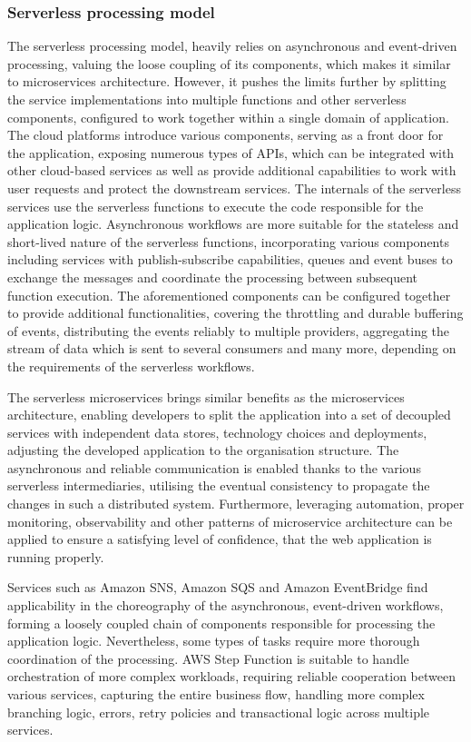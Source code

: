\subsubsection{Serverless processing model}

The serverless processing model, heavily relies on asynchronous and event-driven processing, valuing the loose coupling of its components, which makes it similar to microservices architecture.
However, it pushes the limits further by splitting the service implementations into multiple functions and other serverless components, configured to work together within a single domain of application.
The cloud platforms introduce various components, serving as a front door for the application, exposing numerous types of APIs, which can be integrated with other cloud-based services as well as provide additional capabilities to work with user requests and protect the downstream services.
The internals of the serverless services use the serverless functions to execute the code responsible for the application logic.
Asynchronous workflows are more suitable for the stateless and short-lived nature of the serverless functions, incorporating various components including services with publish-subscribe capabilities, queues and event buses to exchange the messages and coordinate the processing between subsequent function execution.
The aforementioned components can be configured together to provide additional functionalities, covering the throttling and durable buffering of events, distributing the events reliably to multiple providers, aggregating the stream of data which is sent to several consumers and many more, depending on the requirements of the serverless workflows.

The serverless microservices brings similar benefits as the microservices architecture, enabling developers to split the application into a set of decoupled services with independent data stores, technology choices and deployments, adjusting the developed application to the organisation structure.
The asynchronous and reliable communication is enabled thanks to the various serverless intermediaries, utilising the eventual consistency to propagate the changes in such a distributed system.
Furthermore, leveraging automation, proper monitoring, observability and other patterns of microservice architecture can be applied to ensure a satisfying level of confidence, that the web application is running properly.

Services such as Amazon SNS, Amazon SQS and Amazon EventBridge find applicability in the choreography of the asynchronous, event-driven workflows, forming a loosely coupled chain of components responsible for processing the application logic.
Nevertheless, some types of tasks require more thorough coordination of the processing.
AWS Step Function is suitable to handle orchestration of more complex workloads, requiring reliable cooperation between various services, capturing the entire business flow, handling more complex branching logic, errors, retry policies and transactional logic across multiple services.

